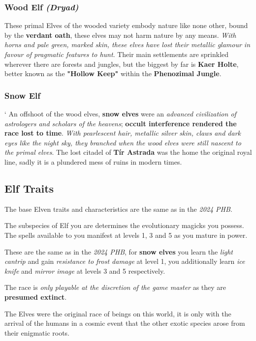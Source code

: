 \subsubsection{Wood Elf \textit{(Dryad)}}
These primal Elves of the wooded variety embody nature like none other, bound by the \textbf{verdant oath}, these elves may not harm nature by any means. \textit{With horns and pale green, marked skin, these elves have lost their metallic glamour in favour of pragmatic features to hunt}. Their main settlements are sprinkled wherever there are forests and jungles, but the biggest by far is \textbf{Kaer Holte}, better known as the \textbf{"Hollow Keep"} within the \textbf{Phenozimal Jungle}.

\subsubsection{Snow Elf}`
An offshoot of the wood elves, \textbf{snow elves} were an \textit{advanced civilization of astrologers and scholars of the heavens}; \textbf{occult interference rendered the race lost to time}. \textit{With pearlescent hair, metallic silver skin, claws and dark eyes like the night sky, they branched when the wood elves were still nascent to the primal elves}. The lost citadel of \textbf{Tír Astrada} was the home the original royal line, sadly it is a plundered mess of ruins in modern times.

\subsection{Elf Traits}
The base Elven traits and characteristics are the same as in the \textit{2024 PHB}.

The subspecies of Elf you are determines the evolutionary magicks you possess. The spells available to you manifest at levels 1, 3 and 5 as you mature in power.

These are the same as in the \textit{2024 PHB}, for \textbf{snow elves} you learn the \textit{light cantrip} and gain \textit{resistance to frost damage} at level 1, you additionally learn \textit{ice knife} and \textit{mirror image} at levels 3 and 5 respectively. 

The race is \textit{only playable at the discretion of the game master} as they are \textbf{presumed extinct}.

\begin{DndReadAloud}
   The Elves were the original race of beings on this world, it is only with the arrival of the humans in a cosmic event that the other exotic species arose from their enigmatic roots.
\end{DndReadAloud}

